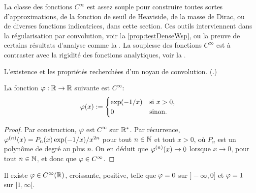La classe des fonctions $C^\infty$ est assez souple pour construire toutes sortes d'approximations, de la fonction de seuil de Heaviside, de la masse de Dirac, ou de diverses fonctions indicatrices, dans cette section. Ces outils interviennent dans la régularisation par convolution, voir la \cref{prop:testDenseWsp}, ou la preuve de certains résultats d'analyse comme la . La souplesse des fonctions $C^\infty$ est à contraster avec la rigidité des fonctions analytiques, voir la .


\begin{retenir}
L'existence et les propriétés recherchées d'un noyau de convolution. (.)	
\end{retenir}



\begin{lemma}
\label{lem:cinfExpInv}
%
	La fonction $\varphi : \mathbb{R}\to \mathbb{R}$ suivante est $C^\infty$: 
	\begin{equation}
		\varphi(x) := \begin{cases}
			\exp(-1/x) & \text{si } x>0, \\
			0 & \text{sinon}.
		\end{cases}		
	\end{equation}
\end{lemma}

\begin{proof}
	Par construction, $\varphi$ est $C^\infty$ sur $\mathbb{R}^*$. Par récurrence, $\varphi^{(n)}(x) = P_n(x)\exp(-1/x)/x^{2n}$ pour tout $n \in \mathbb{N}$ et tout $x>0$, où $P_n$ est un polynôme de degré au plus $n$. On en déduit que $\varphi^{(n)}(x) \to 0$ lorsque $x\to 0$, pour tout $n \in \mathbb{N}$, et donc que $\varphi\in C^\infty$. 
\end{proof}




\begin{proposition}
\label{prop:cinfHeaviside}
%
	Il existe $\varphi \in C^\infty(\mathbb{R})$, croissante, positive, telle que $\varphi=0$ sur $]-\infty,0]$ et $\varphi=1$ sur $[1,\infty[$. 
\end{proposition}

